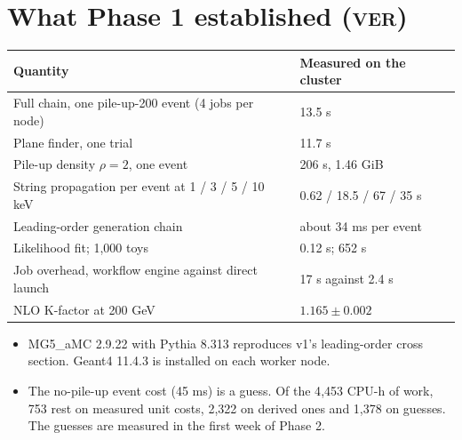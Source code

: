 \documentclass[11pt,a4paper]{article}
\newcommand{\ver}{\textsc{ver}}
\begin{document}
\section{What Phase 1 established (\ver)}
\begin{center}
\begin{tabular}{L{7.5cm}L{6.5cm}}
\toprule
Quantity & Measured on the cluster \\
\midrule
Full chain, one pile-up-200 event (4 jobs per node) & 13.5 s \\
Plane finder, one trial & 11.7 s \\
Pile-up density $\rho=2$, one event & 206 s, 1.46 GiB \\
String propagation per event at 1 / 3 / 5 / 10 keV & 0.62 / 18.5 / 67 / 35 s \\
Leading-order generation chain & about 34 ms per event \\
Likelihood fit; 1{,}000 toys & 0.12 s; 652 s \\
Job overhead, workflow engine against direct launch & 17 s against 2.4 s \\
NLO K-factor at 200 GeV & $1.165\pm0.002$ \\
\bottomrule
\end{tabular}
\end{center}
\begin{itemize}
\item MG5\_aMC 2.9.22 with Pythia 8.313 reproduces v1's leading-order cross section. Geant4 11.4.3 is installed
      on each worker node.
\item The no-pile-up event cost (45 ms) is a guess. Of the 4{,}453 CPU-h of work, 753 rest on measured unit
      costs, 2{,}322 on derived ones and 1{,}378 on guesses. The guesses are measured in the first week of Phase 2.
\end{itemize}
\end{document}

